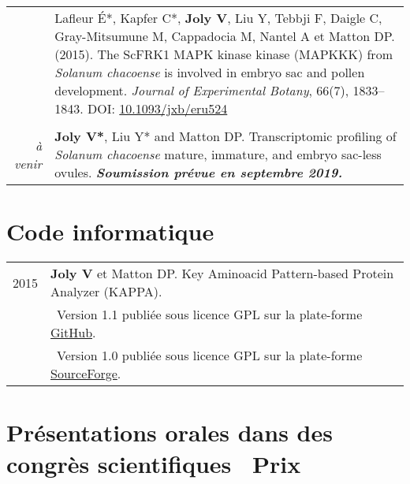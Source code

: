 \documentclass[letterpaper,12pt]{article}
\begin{document}
\begin{tabularx}{\textwidth}{@{}r|X@{}}
& Lafleur É*, Kapfer C*, \textbf{Joly V}, Liu Y, Tebbji F, Daigle C,
  Gray-Mitsumune M, Cappadocia M, Nantel A et Matton DP. (2015).
  The ScFRK1 MAPK kinase kinase (MAPKKK) from \emph{Solanum chacoense} is
  involved in embryo sac and pollen development.
  \emph{Journal of Experimental Botany}, 66(7), 1833--1843.
  DOI: \href{http://doi.org/10.1093/jxb/eru524}{10.1093/jxb/eru524}
  \\

%

\multicolumn{2}{c}{} \\

{\em à venir}
& \textbf{Joly V*}, Liu Y* and Matton DP.
  Transcriptomic profiling of \emph{Solanum chacoense} mature, immature, and
  embryo sac-less ovules.
  {\bfseries\em Soumission prévue en septembre 2019.}
  \\

\end{tabularx}

\vspace{6mm}

\section[Code informatique]{Code informatique}

\begin{tabularx}{\textwidth}{@{}r|X@{}}

2015
& \textbf{Joly V} et Matton DP. Key Aminoacid Pattern-based Protein Analyzer (KAPPA). \\
& \small \hspace{1.5mm} \textbullet{}~Version 1.1 publiée sous licence GPL sur la plate-forme \href{https://github.com/valentinjoly/kappa-1.1}{GitHub}. \\
& \small \hspace{1.5mm} \textbullet{}~Version 1.0 publiée sous licence GPL sur la plate-forme \href{https://sourceforge.net/projects/kappa-sequence-search/}{SourceForge}.
\\

\end{tabularx}

\newpage

\section[Présentations orales]{
  Présentations orales \small dans des congrès scientifiques \hfill {\mdseries\faStar}~Prix}
\end{document}
